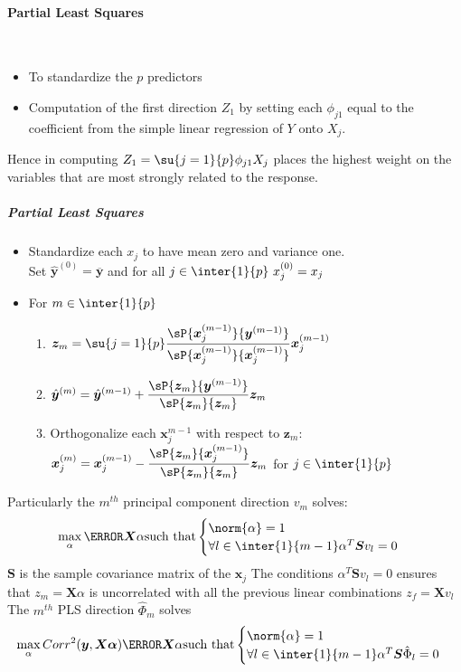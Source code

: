 \paragraph{Partial Least Squares}
\\
\begin{itemize}
	\item To standardize the $p$ predictors
	\item Computation of the first direction $Z_{1}$ by setting 
		each $\phi_{j1}$ equal to the coefficient from the
		simple linear regression of $Y$ onto $X_{j}$.
\end{itemize}
Hence in computing $Z_{1}=\su{{j=1}}{p}\phi_{j1}X_{j}$ places the 
highest weight on the variables that are most strongly related to the
response.
\subparagraph{Partial Least Squares}
\begin{itemize}
	\item Standardize each $x_{j}$ to have mean zero and variance
		one.\\ Set $\hat{\bm{y}}^{(0)}=\overline{\bm{y}}$ and
		for all $j\in\inter{1}{p}~x_{j}^{(0)}=x_{j}$ 
	\item For $m\in\inter{1}{p}$
		\begin{enumerate}[label=(\alph*)]
			\item $\bm{z}_{m}=\su{{j=1}}{p}\dfrac{\sP{\bm{x}_{j}^{(m-1)}}{\bm{y}^{(m-1)}}
				}{\sP{\bm{x}_{j}^{(m-1)}}{\bm{x}_{j}^{(m-1)}}}\bm{x}_{j}^{(m-1)}$
			\item $\hat{\bm{y}}^{(m)} = 
				\hat{\bm{y}}^{(m-1)} + 
				\dfrac{\sP{\bm{z}_{m}}{\bm{y}^{(m-1)}}}{\sP{\bm{z}_{m}}{\bm{z}_{m}}}\bm{z}_{m}$
			\item Orthogonalize each $\bm{x}_{j}^{m-1}$ 
				with respect to $\bm{z}_{m}$:\\
				$\bm{x}_{j}^{(m)}=\bm{x}_{j}^{(m-1)}-
				\dfrac{\sP{\bm{z}_{m}}{\bm{x}_{j}^{(m-1)}}}{\sP{\bm{z}_{m}}{\bm{z}_{m}}}\bm{z}_{m}$ for $j\in\inter{1}{p}$
		\end{enumerate}
\end{itemize}
Particularly  the $m^{th}$ principal component direction $v_{m}$ solves:
$$ \max_{\alpha} \V{\bm{X}\alpha} \text{such that}
\begin{cases} 
	\norm{\alpha}=1 \\ 
	\forall l\in \inter{1}{m-1} \alpha^{T}\bm{S}v_{l} = 0
\end{cases}$$
$\bm{S}$ is the sample covariance matrix of the $\bm{x}_{j}$
The conditions $\alpha^{T}\bm{S}v_{l}=0$ ensures that $z_{m} = \bm{X}\alpha$ is 
uncorrelated with all the previous linear combinations $z_{f}=\bm{X}v_{l}$\\
The $m^{th}$ PLS direction $\hat{\Phi}_{m}$ solves 
$$ \max_{\alpha} Corr^{2}(\bm{y}, \bm{X\alpha})\V{\bm{X}\alpha} \text{such that}
\begin{cases} 
	\norm{\alpha}=1 \\ 
	\forall l\in \inter{1}{m-1} \alpha^{T}\bm{S}\hat{\Phi}_{l} = 0
\end{cases}$$

